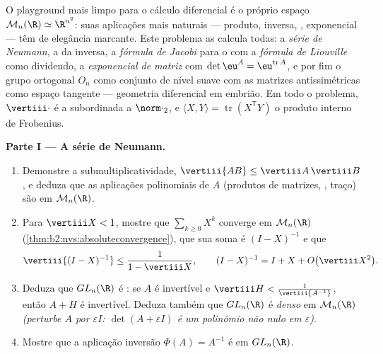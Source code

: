 \begin{problem}\label{pb:b2:diffcalc:1}
O playground mais limpo para o cálculo diferencial é o próprio espaço
$\mathcal M_n(\R) \simeq \R^{n^2}$: suas aplicações mais naturais
--- produto, inversa, , exponencial --- têm
 de elegância marcante. Este problema as calcula
todas: a \emph{série de Neumann}, a  da inversa,
a \emph{fórmula de Jacobi} para o
 com a \emph{fórmula de Liouville} como dividendo, a
\emph{exponencial de matriz} com
$\det\eu^A = \eu^{\operatorname{tr}A}$, e por fim o
grupo ortogonal $O_n$ como conjunto de nível suave com as
matrizes antissimétricas como espaço tangente --- geometria
diferencial em embrião. Em todo o problema, $\vertiii\cdot$ é a  subordinada a $\norm\cdot_2$, e $\langle X, Y\rangle =
\operatorname{tr}(X^{\mathsf T}Y)$ o produto interno de Frobenius.

\medskip
\noindent\textbf{Parte I --- A série de Neumann.}
\begin{enumerate}
  \item Demonstre a submultiplicatividade, $\vertiii{AB} \leq
        \vertiii A\,\vertiii B$, e deduza que as aplicações
        polinomiais de $A$ (produtos de matrizes, , traço) são
         em $\mathcal M_n(\R)$.
  \item Para $\vertiii X < 1$, mostre que $\sum_{k\geq0}X^k$
        converge  em $\mathcal M_n(\R)$
        (\cref{thm:b2:nvs:absoluteconvergence}), que sua soma
        é $(I - X)^{-1}$ e que
        \[
        \vertiii{(I - X)^{-1}} \leq \frac{1}{1 - \vertiii X},
        \qquad
        (I - X)^{-1} = I + X + O\bigl(\vertiii X^2\bigr) .
        \]
  \item Deduza que $GL_n(\R)$ é \emph{}: se $A$ é
        invertível e $\vertiii H <
        \frac{1}{\vertiii{A^{-1}}}$, então $A + H$ é
        invertível. Deduza também que $GL_n(\R)$ é \emph{denso}
        em $\mathcal M_n(\R)$ \emph{(perturbe $A$ por
        $\varepsilon I$: $\det(A + \varepsilon I)$ é um polinômio não nulo
        em $\varepsilon$)}.
  \item Mostre que a aplicação inversão $\Phi(A) = A^{-1}$ é
         em $GL_n(\R)$.
\end{enumerate}


\end{problem}
